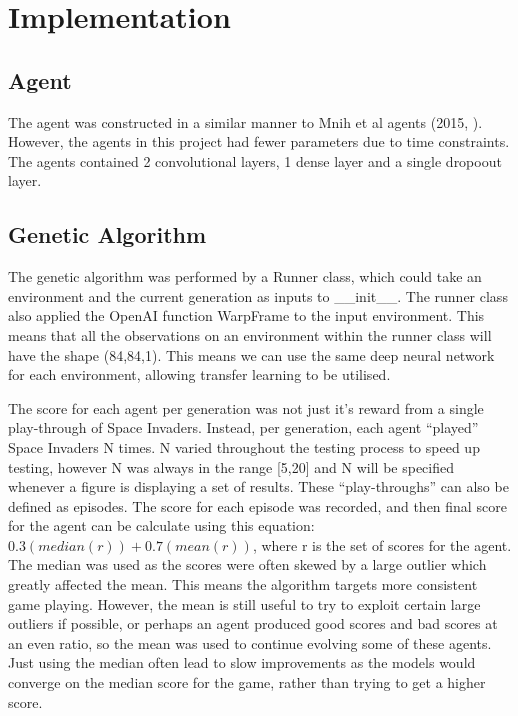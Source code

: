 \chapter{Implementation}

\section{Agent}

The agent was constructed in a similar manner to Mnih et al agents (2015, \cite{mnih}). However, the agents in this project had fewer parameters due to time constraints. The agents contained 2 convolutional layers, 1 dense layer and a single dropoout layer.

\section{Genetic Algorithm}

The genetic algorithm was performed by a Runner class, which could take an environment and the current generation as inputs to \_\_init\_\_. The runner class also applied the OpenAI function WarpFrame to the input environment. This means that all the observations on an environment within the runner class will have the shape (84,84,1). This means we can use the same deep neural network for each environment, allowing transfer learning to be utilised.

The score for each agent per generation was not just it's reward from a single play-through of Space Invaders. Instead, per generation, each agent ``played'' Space Invaders N times. N varied throughout the testing process to speed up testing, however N was always in the range [5,20] and N will be specified whenever a figure is displaying a set of results. These ``play-throughs'' can also be defined as episodes. The score for each episode was recorded, and then final score for the agent can be calculate using this equation: $0.3(median(r)) + 0.7(mean(r))$, where r is the set of scores for the agent. The median was used as the scores were often skewed by a large outlier which greatly affected the mean. This means the algorithm targets more consistent game playing. However, the mean is still useful to try to exploit certain large outliers if possible, or perhaps an agent produced good scores and bad scores at an even ratio, so the mean was used to continue evolving some of these agents. Just using the median often lead to slow improvements as the models would converge on the median score for the game, rather than trying to get a higher score.

